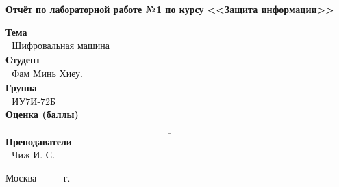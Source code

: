 \begin{titlepage}
	\begin{center}
		\Large\textbf{Отчёт по лабораторной работе №1 по курсу <<Защита информации>>}
	\end{center}


	\noindent\textbf{Тема} $\underline{\text{~~Шифровальная машина <<Энигма>>~~~~~~~~~~~~~~~~~~~~~~~~~~~~~~~~~~~~~~~~~~~~~~~~~~~~~~~~~~~~~~~~~~~~~~}}$\newline\newline
	\noindent\textbf{Студент} $\underline{\text{~~Фам Минь Хиеу. ~~~~~~~~~~~~~~~~~~~~~~~~~~~~~~~~~~~~~~~~~~~~~~~~~~~~~~~~~~~~~~~~~~~~~~~~~~~~~~~~~~~~~~~~~~}}$\newline\newline
	\noindent\textbf{Группа} $\underline{\text{~~ИУ7И-72Б~~~~~~~~~~~~~~~~~~~~~~~~~~~~~~~~~~~~~~~~~~~~~~~~~~~~~~~~~~~~~~~~~~~~~~~~~~~~~~~~~~~~~~~~~~~~~~~~~~~~~~}}$\newline\newline
	\noindent\textbf{Оценка (баллы)} $\underline{\text{~~~~~~~~~~~~~~~~~~~~~~~~~~~~~~~~~~~~~~~~~~~~~~~~~~~~~~~~~~~~~~~~~~~~~~~~~~~~~~~~~~~~~~~~~~~~~~~~~~~~~~~}}$\newline\newline
	\noindent\textbf{Преподаватели} $\underline{\text{~~Чиж И.~С.~~~~~~~~~~~~~~~~~~~~~~~~~~~~~~~~~~~~~~~~~~~~~~~~~~~~~~~~~~~~~~~~~~~~~~~~~~~~~~~~~~~~~~~}}$\newline

	\begin{center}
		\vfill
		Москва~---~\the\year
		~г.
	\end{center}
	\restoregeometry
\end{titlepage}
